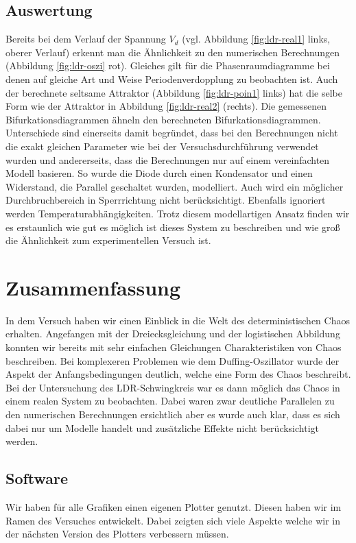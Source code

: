 \documentclass[12pt,a4paper]{article}
\begin{document}
\subsection { Auswertung }
Bereits bei dem Verlauf der Spannung $V_d$ (vgl. Abbildung \ref{fig:ldr-real1} links, oberer Verlauf) erkennt man die Ähnlichkeit zu den numerischen Berechnungen (Abbildung \ref{fig:ldr-oszi} rot). Gleiches gilt für die Phasenraumdiagramme bei denen auf gleiche Art und Weise Periodenverdopplung zu beobachten ist. Auch der berechnete seltsame Attraktor (Abbildung \ref{fig:ldr-poin1} links) hat die selbe Form wie der Attraktor in Abbildung \ref{fig:ldr-real2} (rechts).
\newline
Die gemessenen Bifurkationsdiagrammen ähneln den berechneten Bifurkationsdiagrammen.
Unterschiede sind einerseits damit begründet, dass bei den Berechnungen nicht die exakt gleichen Parameter wie bei der Versuchsdurchführung verwendet wurden und andererseits, dass die Berechnungen nur auf einem vereinfachten Modell basieren. So wurde die Diode durch einen Kondensator und einen Widerstand, die Parallel geschaltet wurden, modelliert. Auch wird ein möglicher Durchbruchbereich in Sperrrichtung nicht berücksichtigt. Ebenfalls ignoriert werden Temperaturabhängigkeiten. Trotz diesem modellartigen Ansatz finden wir es erstaunlich wie gut es möglich ist dieses System zu beschreiben und wie groß die Ähnlichkeit zum experimentellen Versuch ist.
\pagebreak
\section { Zusammenfassung }
In dem Versuch haben wir einen Einblick in die Welt des deterministischen Chaos erhalten. Angefangen mit der Dreiecksgleichung und der logistischen Abbildung konnten wir bereits mit sehr einfachen Gleichungen Charakteristiken von Chaos beschreiben. Bei komplexeren Problemen wie dem Duffing-Oszillator wurde der Aspekt der Anfangsbedingungen deutlich, welche eine Form des Chaos beschreibt. Bei der Untersuchung des LDR-Schwingkreis war es dann möglich das Chaos in einem realen System zu beobachten. Dabei waren zwar deutliche Parallelen zu den numerischen Berechnungen ersichtlich aber es wurde auch klar, dass es sich dabei nur um Modelle handelt und zusätzliche Effekte nicht berücksichtigt werden.
\subsection{Software}
Wir haben für alle Grafiken einen eigenen Plotter genutzt. Diesen haben wir im Ramen des Versuches entwickelt. Dabei zeigten sich viele Aspekte welche wir in der nächsten Version des Plotters verbessern müssen.
\end{document}
